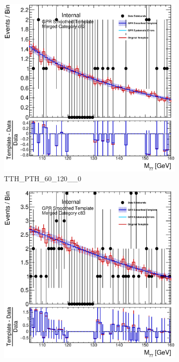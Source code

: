 \begin{figure} 
\begin{center}
\begin{subfigure}[T]{0.49\linewidth}
	\centering
	\includegraphics[width=\linewidth]{figures/background/gpr/coupCatTemplates/GPR_Smoothed_Plot_hmgg_c82.eps}
	\caption{TTH\_PTH\_60\_120\_\_0}
\end{subfigure}
\begin{subfigure}[T]{0.49\linewidth}
	\centering
	\includegraphics[width=\linewidth]{figures/background/gpr/coupCatTemplates/GPR_Smoothed_Plot_hmgg_c83.eps}

\end{subfigure}
\end{center}
\end{figure}
